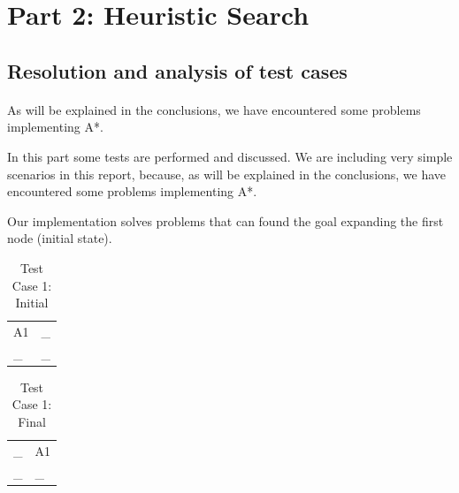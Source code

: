 
\section{Part 2: Heuristic Search}

\subsection{Resolution and analysis of test cases}

\paragraph{}
As will be explained in the conclusions, we have encountered some problems
implementing A*.

In this part some tests are performed and discussed. We are including very
simple scenarios in this report, because, as will be explained in the
conclusions, we have encountered some problems implementing A*.

Our implementation solves problems that can found the goal expanding the first
node (initial state).

\begin{table}[H]
\centering
\caption{Test Case 1: Initial}
\label{Test Case 1: Initial}
\begin{tabular}{ll}
A1 & \_ \\
\_ & \_
\end{tabular}
\end{table}

\begin{table}[H]
\centering
\caption{Test Case 1: Final}
\label{Test Case 1: Final}
\begin{tabular}{ll}
\_ & A1 \\
\_ & \_
\end{tabular}
\end{table}
